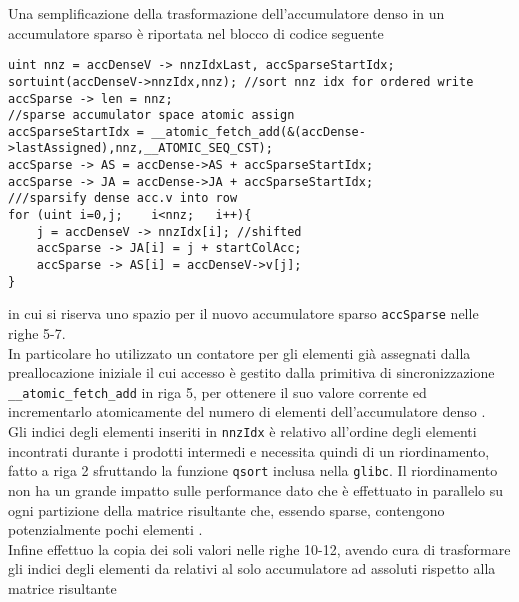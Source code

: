 Una semplificazione della trasformazione dell'accumulatore denso in un
accumulatore sparso è riportata nel blocco di codice seguente
\begin{lstlisting}
uint nnz = accDenseV -> nnzIdxLast, accSparseStartIdx;
sortuint(accDenseV->nnzIdx,nnz); //sort nnz idx for ordered write
accSparse -> len = nnz;
//sparse accumulator space atomic assign
accSparseStartIdx = __atomic_fetch_add(&(accDense->lastAssigned),nnz,__ATOMIC_SEQ_CST); 
accSparse -> AS = accDense->AS + accSparseStartIdx; 
accSparse -> JA = accDense->JA + accSparseStartIdx; 
///sparsify dense acc.v into row
for (uint i=0,j;    i<nnz;   i++){ 
    j = accDenseV -> nnzIdx[i]; //shifted 
    accSparse -> JA[i] = j + startColAcc;
    accSparse -> AS[i] = accDenseV->v[j];
}
\end{lstlisting}
in cui si riserva uno spazio per il nuovo accumulatore sparso \verb|accSparse|
nelle righe 5-7.\\
In particolare ho utilizzato un contatore per gli elementi già assegnati dalla
preallocazione iniziale il cui accesso è gestito dalla primitiva di sincronizzazione 
\verb|__atomic_fetch_add| in riga 5, per ottenere il suo valore corrente 
ed incrementarlo atomicamente del numero di elementi \nnz dell'accumulatore denso 
.\\
Gli indici degli elementi \nnz inseriti in \verb|nnzIdx| è relativo all'ordine
degli elementi \nnz incontrati durante i prodotti intermedi e necessita quindi
di un riordinamento, fatto a riga 2 
sfruttando la funzione \verb|qsort| inclusa nella \verb|glibc|.
Il riordinamento non ha un grande impatto sulle performance dato che 
è effettuato in parallelo su ogni partizione della matrice risultante che,
essendo sparse, contengono potenzialmente pochi elementi \nnz .\\
Infine effettuo la copia dei soli valori \nnz nelle righe 10-12,
avendo cura di trasformare gli indici degli elementi \nnz da relativi al solo
accumulatore ad assoluti rispetto alla matrice risultante


